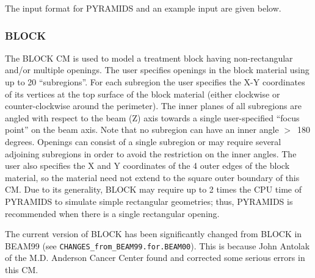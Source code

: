 \documentclass[12pt,twoside]{article}
\begin{document}

\clearpage
The input format for PYRAMIDS and an example input are given below.
\begin{small}

\end{small}




\subsubsection{BLOCK}
\renewcommand{\rightmark}{BLOCK CM}
The BLOCK CM is used to model a treatment block having non-rectangular
and/or multiple openings.  The user specifies openings in the block
material using up to 20 ``subregions''.  For each subregion the user
specifies the X-Y coordinates of its vertices at the top surface of the
block material (either clockwise or counter-clockwise around the
perimeter).  The inner planes of all subregions are angled with respect to
the beam (Z) axis towards a single user-specified ``focus point'' on the
beam axis.  Note that no subregion can have an inner
angle $>$~180 degrees.
Openings can consist of a single subregion or may require
several adjoining subregions in order to avoid the restriction on the inner
angles.
The user also specifies the X and Y coordinates
of the 4 outer edges of the block material, so the material need not
extend to the square outer boundary of this CM.  Due to its generality,
BLOCK may require up to 2 times the CPU time of PYRAMIDS to simulate
simple rectangular geometries; thus, PYRAMIDS is recommended when there is
a single rectangular opening.

The current version of BLOCK has been significantly changed from
BLOCK in BEAM99 (see {\tt CHANGES\_from\_BEAM99.for.BEAM00}).  This
is because John Antolak of the M.D. Anderson Cancer Center found and
corrected some serious errors in this CM.
\end{document}
